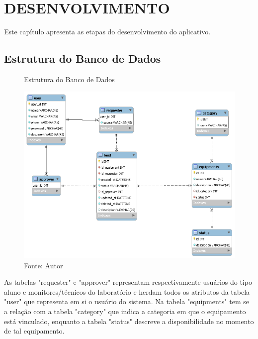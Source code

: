 \chapter{DESENVOLVIMENTO}
\label{cap4}

\vspace{-1.9cm}


Este capítulo apresenta as etapas do desenvolvimento do aplicativo.

    \section{Estrutura do Banco de Dados}
    
    \begin{figure}[h]
    \caption{Estrutura do Banco de Dados}
    \centering %
    \includegraphics[width=14cm]{imagem/bd-structure.png}
    \caption*{Fonte: Autor}
    \label{figure:bd-structure}
    \end{figure}
    
    \clearpage
    
    As tabelas "requester" e "approver" representam respectivamente usuários do tipo aluno e monitores/técnicos do laboratório e herdam todos os atributos da tabela "user" que representa em si o usuário do sistema. Na tabela "equipments" tem se a relação com a tabela "category" que indica a categoria em que o equipamento está vinculado, enquanto a tabela "status" descreve a disponibilidade no momento de tal equipamento.
    
